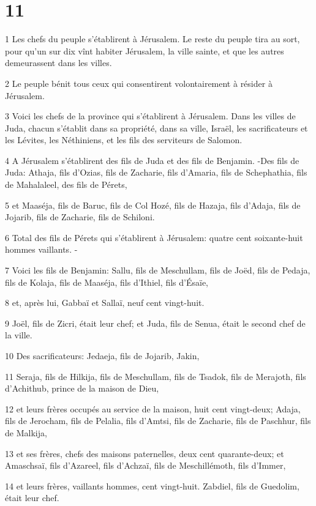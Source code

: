 \chapter{11}

\par 1 Les chefs du peuple s'établirent à Jérusalem. Le reste du peuple tira au sort, pour qu'un sur dix vînt habiter Jérusalem, la ville sainte, et que les autres demeurassent dans les villes.
\par 2 Le peuple bénit tous ceux qui consentirent volontairement à résider à Jérusalem.
\par 3 Voici les chefs de la province qui s'établirent à Jérusalem. Dans les villes de Juda, chacun s'établit dans sa propriété, dans sa ville, Israël, les sacrificateurs et les Lévites, les Néthiniens, et les fils des serviteurs de Salomon.
\par 4 A Jérusalem s'établirent des fils de Juda et des fils de Benjamin. -Des fils de Juda: Athaja, fils d'Ozias, fils de Zacharie, fils d'Amaria, fils de Schephathia, fils de Mahalaleel, des fils de Pérets,
\par 5 et Maaséja, fils de Baruc, fils de Col Hozé, fils de Hazaja, fils d'Adaja, fils de Jojarib, fils de Zacharie, fils de Schiloni.
\par 6 Total des fils de Pérets qui s'établirent à Jérusalem: quatre cent soixante-huit hommes vaillants. -
\par 7 Voici les fils de Benjamin: Sallu, fils de Meschullam, fils de Joëd, fils de Pedaja, fils de Kolaja, fils de Maaséja, fils d'Ithiel, fils d'Ésaïe,
\par 8 et, après lui, Gabbaï et Sallaï, neuf cent vingt-huit.
\par 9 Joël, fils de Zicri, était leur chef; et Juda, fils de Senua, était le second chef de la ville.
\par 10 Des sacrificateurs: Jedaeja, fils de Jojarib, Jakin,
\par 11 Seraja, fils de Hilkija, fils de Meschullam, fils de Tsadok, fils de Merajoth, fils d'Achithub, prince de la maison de Dieu,
\par 12 et leurs frères occupés au service de la maison, huit cent vingt-deux; Adaja, fils de Jerocham, fils de Pelalia, fils d'Amtsi, fils de Zacharie, fils de Paschhur, fils de Malkija,
\par 13 et ses frères, chefs des maisons paternelles, deux cent quarante-deux; et Amaschsaï, fils d'Azareel, fils d'Achzaï, fils de Meschillémoth, fils d'Immer,
\par 14 et leurs frères, vaillants hommes, cent vingt-huit. Zabdiel, fils de Guedolim, était leur chef.
